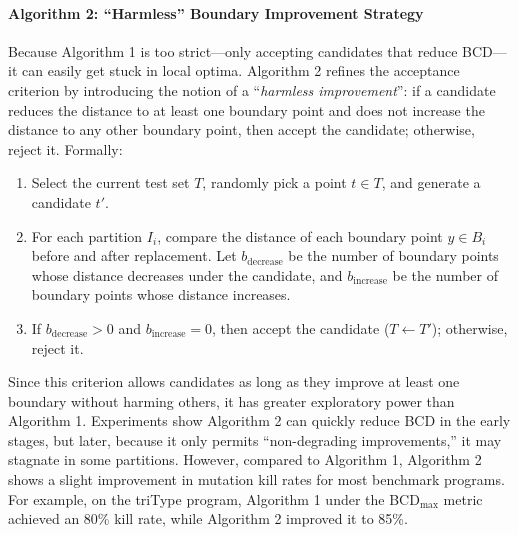 \documentclass[manuscript,screen,review]{acmart}
\begin{document}
\paragraph{Algorithm 2: ``Harmless'' Boundary Improvement Strategy}  
Because Algorithm 1 is too strict—only accepting candidates that reduce BCD—it can easily get stuck in local optima. Algorithm 2 refines the acceptance criterion by introducing the notion of a ``\emph{harmless improvement}'': if a candidate reduces the distance to at least one boundary point and does not increase the distance to any other boundary point, then accept the candidate; otherwise, reject it. Formally:
\begin{enumerate}
  \item Select the current test set $T$, randomly pick a point $t \in T$, and generate a candidate $t'$.
  \item For each partition $I_i$, compare the distance of each boundary point $y \in B_i$ before and after replacement. Let $b_{\mathrm{decrease}}$ be the number of boundary points whose distance decreases under the candidate, and $b_{\mathrm{increase}}$ be the number of boundary points whose distance increases.
  \item If $b_{\mathrm{decrease}} > 0$ and $b_{\mathrm{increase}} = 0$, then accept the candidate ($T \leftarrow T'$); otherwise, reject it.
\end{enumerate}

Since this criterion allows candidates as long as they improve at least one boundary without harming others, it has greater exploratory power than Algorithm 1. Experiments show Algorithm 2 can quickly reduce BCD in the early stages, but later, because it only permits ``non-degrading improvements,'' it may stagnate in some partitions. However, compared to Algorithm 1, Algorithm 2 shows a slight improvement in mutation kill rates for most benchmark programs. For example, on the triType program, Algorithm 1 under the BCD$_{\max}$ metric achieved an 80\% kill rate, while Algorithm 2 improved it to 85\%.
\end{document}
